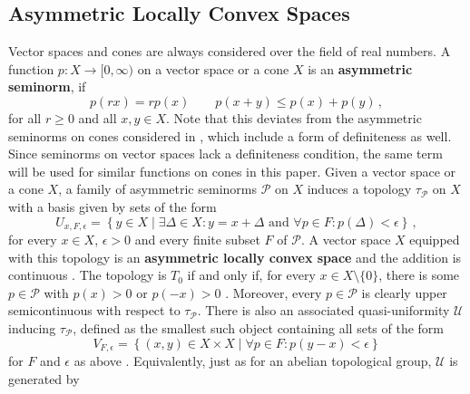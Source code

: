 \documentclass[
	paper=A4,
	pagesize=auto,
	fontsize=12pt
]{scrartcl}
\theoremstyle{plain}
\theoremstyle{remark}
\theoremstyle{definition}
\begin{document}
\subsection{Asymmetric Locally Convex Spaces}
%
Vector spaces and cones are always considered over the field of real numbers.
A function $p : X \to [0, \infty)$ on a vector space or a cone $X$ is an \textbf{asymmetric seminorm}, if
%
\begin{equation}
p \left( r x \right) = r p \left( x \right)
\qquad
p \left( x + y \right) \le p \left( x \right) + p \left( y \right) \, ,
\end{equation}
%
for all $r \ge 0$ and all $x, y \in X$.
Note that this deviates from the asymmetric seminorms on cones considered in \cite[Section 2.3.3]{src:Cobzaş:FunctionalAnalysisinAsymmetricNormedSpaces}, which include a form of definiteness as well.
Since seminorms on vector spaces lack a definiteness condition, the same term will be used for similar functions on cones in this paper.
Given a vector space or a cone $X$, a family of asymmetric seminorms $\mathcal{P}$ on $X$ induces a topology $\tau_{\mathcal{P}}$ on $X$ with a basis given by sets of the form
%
\begin{equation}
U_{x, F, \epsilon}
=
\left\{ y \in X \middle| \exists \Delta \in X : y = x + \Delta \text{ and } \forall p \in F : p \left( \Delta \right) < \epsilon \right\} \, ,
\end{equation}
%
for every $x \in X$, $\epsilon > 0$ and every finite subset $F$ of $\mathcal{P}$.
A vector space $X$ equipped with this topology is an \textbf{asymmetric locally convex space} and the addition is continuous \cite[Section 1.1.7]{src:Cobzaş:FunctionalAnalysisinAsymmetricNormedSpaces}.
The topology is $T_0$ if and only if, for every $x \in X \setminus \{ 0 \}$, there is some $p \in \mathcal{P}$ with $p(x) > 0$ or $p(-x) > 0$ \cite[Proposition 1.1.63]{src:Cobzaş:FunctionalAnalysisinAsymmetricNormedSpaces}.
Moreover, every $p \in \mathcal{P}$ is clearly upper semicontinuous with respect to $\tau_{\mathcal{P}}$.
There is also an associated quasi-uniformity $\mathcal{U}$ inducing $\tau_{\mathcal{P}}$, defined as the smallest such object containing all sets of the form
%
\begin{equation}
V_{F, \epsilon}
=
\left\{ \left( x, y \right) \in X \times X \middle|
\forall p \in F : p \left( y - x \right) < \epsilon
\right\}
\end{equation}
%
for $F$ and $\epsilon$ as above \cite[Section 1.1.7]{src:Cobzaş:FunctionalAnalysisinAsymmetricNormedSpaces}.
Equivalently, just as for an abelian topological group, $\mathcal{U}$ is generated by
\end{document}
